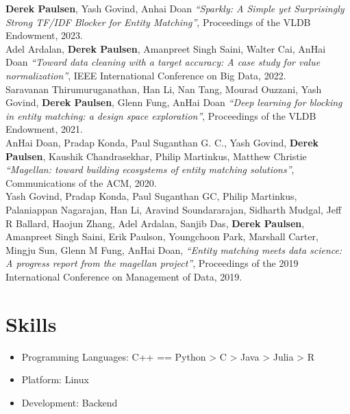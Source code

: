 \documentclass{resume}
\begin{document}
\textbf{Derek Paulsen}, Yash Govind, Anhai Doan
\textit{``Sparkly: A Simple yet Surprisingly Strong TF/IDF Blocker for Entity Matching''},
Proceedings of the VLDB Endowment, 2023.\\

Adel Ardalan, \textbf{Derek Paulsen}, Amanpreet Singh Saini, Walter Cai, AnHai Doan
\textit{``Toward data cleaning with a target accuracy: A case study for value normalization''},
IEEE International Conference on Big Data, 2022.\\

Saravanan Thirumuruganathan, Han Li, Nan Tang, Mourad Ouzzani, Yash Govind, \textbf{Derek Paulsen}, Glenn Fung, AnHai Doan
\textit{``Deep learning for blocking in entity matching: a design space exploration''},
Proceedings of the VLDB Endowment, 2021.\\

AnHai Doan, Pradap Konda, Paul Suganthan G. C., Yash Govind, \textbf{Derek Paulsen}, Kaushik Chandrasekhar, Philip Martinkus, Matthew Christie
\textit{``Magellan: toward building ecosystems of entity matching solutions''},
Communications of the ACM, 2020.\\

Yash Govind, Pradap Konda, Paul Suganthan GC, Philip Martinkus, Palaniappan Nagarajan, Han Li, Aravind Soundararajan, Sidharth Mudgal, Jeff R Ballard, Haojun Zhang, Adel Ardalan, Sanjib Das, \textbf{Derek Paulsen}, Amanpreet Singh Saini, Erik Paulson, Youngchoon Park, Marshall Carter, Mingju Sun, Glenn M Fung, AnHai Doan,
\textit{``Entity matching meets data science: A progress report from the magellan project''},
Proceedings of the 2019 International Conference on Management of Data, 2019.\\



\section{Skills}
\begin{itemize}[parsep=0.5ex]
  \item Programming Languages: C++ == Python > C > Java > Julia > R
  \item Platform: Linux
  \item Development: Backend
\end{itemize}
\end{document}
